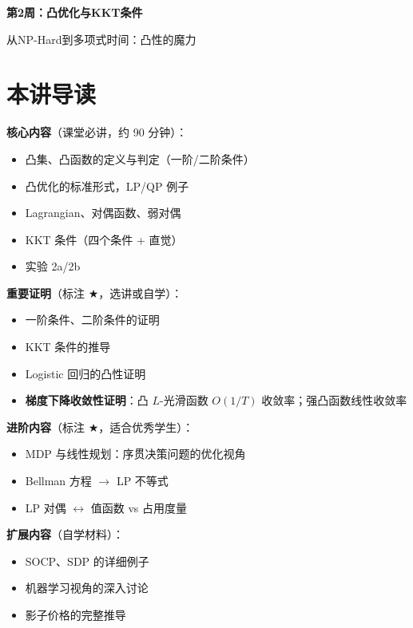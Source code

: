 \documentclass[12pt, a4paper]{ctexart}
\begin{document}
\begin{center}
{\LARGE\bfseries 第2周：凸优化与KKT条件}

\vspace{0.5cm}
{\large 从NP-Hard到多项式时间：凸性的魔力}
\end{center}

\tableofcontents
\newpage

\section*{本讲导读}

\begin{blackboard}[内容层次]

\textbf{核心内容}（课堂必讲，约 90 分钟）：
\begin{itemize}
    \item 凸集、凸函数的定义与判定（一阶/二阶条件）
    \item 凸优化的标准形式，LP/QP 例子
    \item Lagrangian、对偶函数、弱对偶
    \item KKT 条件（四个条件 + 直觉）
    \item 实验 2a/2b
\end{itemize}

\textbf{重要证明}（标注 $\bigstar$，选讲或自学）：
\begin{itemize}
    \item 一阶条件、二阶条件的证明
    \item KKT 条件的推导
    \item Logistic 回归的凸性证明
    \item \textbf{梯度下降收敛性证明}：凸 $L$-光滑函数 $O(1/T)$ 收敛率；强凸函数线性收敛率
\end{itemize}

\textbf{进阶内容}（标注 $\bigstar$，适合优秀学生）：
\begin{itemize}
    \item MDP 与线性规划：序贯决策问题的优化视角
    \item Bellman 方程 $\to$ LP 不等式
    \item LP 对偶 $\leftrightarrow$ 值函数 vs 占用度量
\end{itemize}

\textbf{扩展内容}（自学材料）：
\begin{itemize}
    \item SOCP、SDP 的详细例子
    \item 机器学习视角的深入讨论
    \item 影子价格的完整推导
\end{itemize}

\end{blackboard}
\end{document}

